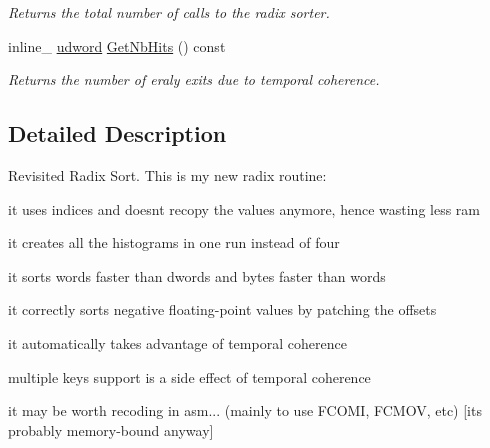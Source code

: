 \begin{DoxyCompactItemize}
\begin{DoxyCompactList}\small\item\em Returns the total number of calls to the radix sorter. \end{DoxyCompactList}\item 
inline\+\_\+ \hyperlink{IceTypes_8h_a44c6f1920ba5551225fb534f9d1a1733}{udword} \hyperlink{classRadixSort_ac69a0a1cc27abac0bd986233dd5fc12a}{Get\+Nb\+Hits} () const \hypertarget{classRadixSort_ac69a0a1cc27abac0bd986233dd5fc12a}{}\label{classRadixSort_ac69a0a1cc27abac0bd986233dd5fc12a}

\begin{DoxyCompactList}\small\item\em Returns the number of eraly exits due to temporal coherence. \end{DoxyCompactList}\end{DoxyCompactItemize}


\subsection{Detailed Description}
Revisited Radix Sort. This is my new radix routine\+:
\begin{DoxyItemize}
\item it uses indices and doesn\textquotesingle{}t recopy the values anymore, hence wasting less ram
\item it creates all the histograms in one run instead of four
\item it sorts words faster than dwords and bytes faster than words
\item it correctly sorts negative floating-\/point values by patching the offsets
\item it automatically takes advantage of temporal coherence
\item multiple keys support is a side effect of temporal coherence
\item it may be worth recoding in asm... (mainly to use F\+C\+O\+MI, F\+C\+M\+OV, etc) \mbox{[}it\textquotesingle{}s probably memory-\/bound anyway\mbox{]}
\end{DoxyItemize}

